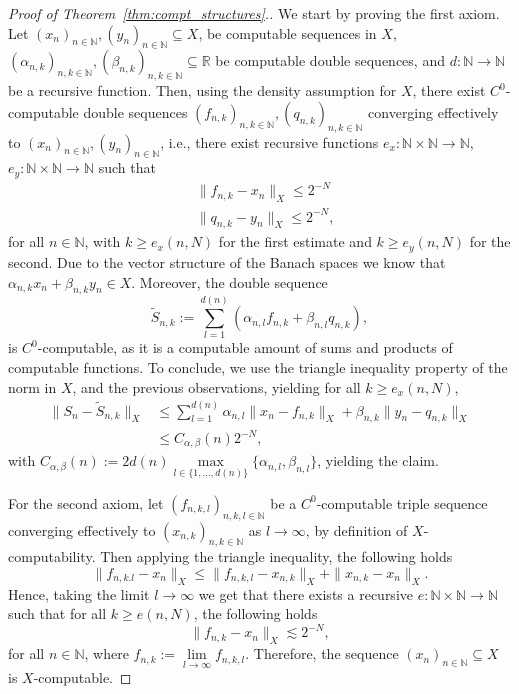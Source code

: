 \documentclass[pdflatex]{sn-jnl}%
\begin{document}
\vspace{-0.0em}\begin{proof}[Proof of Theorem~\ref{thm:compt_structures}.]
    We start by proving the first axiom. Let $(x_n)_{n\in \mathbb{N}},(y_n)_{n\in \mathbb{N}}\subseteq X$, be computable sequences in $X$, $(\alpha_{n,k})_{n,k\in \mathbb{N}}, (\beta_{n,k})_{n,k\in \mathbb{N}}\subseteq\mathbb{R}$ be computable double sequences, and $d:\mathbb{N}\rightarrow \mathbb{N}$ be a recursive function. Then, using the density assumption for $X$, there exist $C^0$-computable double sequences $(f_{n,k})_{n,k\in \mathbb{N}},(q_{n,k})_{n,k\in \mathbb{N}}$ converging effectively to $(x_n)_{n\in \mathbb{N}},(y_n)_{n\in \mathbb{N}}$, i.e., there exist recursive functions $e_x:\mathbb{N}\times\mathbb{N}\rightarrow\mathbb{N}$, $e_y:\mathbb{N}\times \mathbb{N}\rightarrow\mathbb{N}$ such that
    \begin{align}
        &\|f_{n,k}-x_n\|_{X}\leq 2^{-N}\\&
        \|q_{n,k}-y_n\|_{X}\leq 2^{-N},
    \end{align}
    for all $n\in \mathbb{N}$, with $k\geq e_x(n,N)$ for the first estimate and $k\geq e_y(n,N)$ for the second. Due to the vector structure of the Banach spaces we know that $\alpha_{n,k}x_n + \beta_{n,k}y_n\in X$. Moreover, the double sequence 
    \begin{equation}
        \tilde{S}_{n,k}:=\sum \limits_{l=1}^{d(n)}(\alpha_{n,l}f_{n,k}+\beta_{n,l}q_{n,k}),
    \end{equation}
    is $C^0$-computable, as it is a computable amount of sums and products of computable functions. To conclude, we use the triangle inequality property of the norm in $X$, and the previous observations, yielding for all $k\geq e_x(n,N)$,
    \begin{align*}
    \|S_n-\tilde{S}_{n,k}\|_{X}&\leq \sum\limits_{l=1}^{d(n)}\alpha_{n,l}\|x_n-f_{n,k}\|_X+\beta_{n,k}\|y_n-q_{n,k}\|_X\\&
    \leq C_{\alpha,\beta}(n) 2^{-N},
    \end{align*}
    with $C_{\alpha,\beta}(n):=2d(n)\max\limits_{l\in\{1,\dots,d(n)\} }\{\alpha_{n,l},\beta_{n,l}\}$, yielding the claim. 

    For the second axiom, let $(f_{n,k,l})_{n,k,l\in \mathbb{N}}$ be a $C^0$-computable triple sequence converging effectively to $(x_{n,k})_{n,k\in \mathbb{N}}$ as $l\rightarrow \infty$, by definition of $X$-computability. Then applying the triangle inequality, the following holds
    \begin{equation}
    \|f_{n,k.l}-x_{n}\|_X\leq \|f_{n,k,l}-x_{n,k}\|_X + \|x_{n,k}-x_n\|_X.
    \end{equation}
    Hence, taking the limit
    $l\rightarrow\infty$ we get that there exists a recursive $e:\mathbb{N}\times \mathbb{N}\rightarrow\mathbb{N}$ such that for all $k\geq e(n,N)$, the following holds
    \begin{equation}
    \|f_{n,k}-x_n\|_X\lesssim 2^{-N},
    \end{equation}
    for all $n\in \mathbb{N}$, where $f_{n,k}:=\lim\limits_{l\rightarrow \infty}f_{n,k,l}$. Therefore, the sequence $(x_n)_{n\in \mathbb{N}}\subseteq X$ is $X$-computable. 
    

\end{proof}
\end{document}
